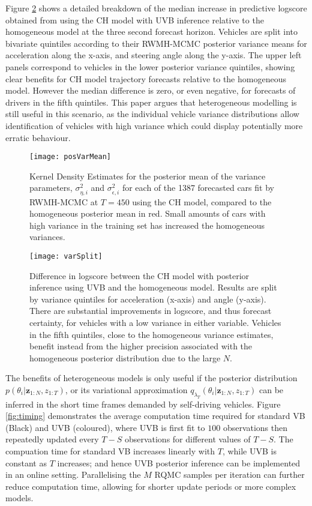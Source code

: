 \documentclass[12pt,a4paper]{article}\usepackage[]{graphicx}\usepackage[]{color}
\begin{document}
Figure \ref{fig:varSplit} shows a detailed breakdown of the median increase in predictive logscore obtained from using the CH model with UVB inference relative to the homogeneous model at the three second forecast horizon. Vehicles are split into bivariate quintiles according to their RWMH-MCMC posterior variance means for acceleration along the x-axis, and steering angle along the y-axis. The upper left panels correspond to vehicles in the lower posterior variance quintiles, showing clear benefits for CH model trajectory forecasts relative to the homogeneous model. However the median difference is zero, or even negative, for forecasts of drivers in the fifth quintiles. This paper argues that heterogeneous modelling is still useful in this scenario, as the individual vehicle variance distributions allow identification of vehicles with high variance which could display potentially more erratic behaviour.
\\


\begin{figure}[ht]
\centering
\texttt{[image: posVarMean]}
\caption{Kernel Density Estimates for the posterior mean of the variance parameters, $\sigma^2_{\eta, i}$ and $\sigma^2_{\epsilon, i}$ for each of the 1387 forecasted cars fit by RWMH-MCMC at $T = 450$ using the CH model, compared to the homogeneous posterior mean in red. Small amounts of cars with high variance in the training set has increased the homogeneous variances.}
\label{fig:posVarMean}
\end{figure}

\begin{figure}[ht]
\centering
\texttt{[image: varSplit]}
\caption{Difference in logscore between the CH model with posterior inference using UVB and the homogeneous model. Results are split by variance quintiles for acceleration (x-axis) and angle (y-axis). There are substantial improvements in logscore, and thus forecast certainty, for vehicles with a low variance in either variable. Vehicles in the fifth quintiles, close to the homogeneous variance estimates, benefit instead from the higher precision associated with the homogeneous posterior distribution due to the large $N$.}
\label{fig:varSplit}
\end{figure}

The benefits of heterogeneous models is only useful if the posterior distribution $p(\theta_{i} | \textbf{z}_{1:N}, z_{1:T})$, or its variational approximation $q_{\lambda_T}(\theta_{i} | \textbf{z}_{1:N}, z_{1:T})$ can be inferred in the short time frames demanded by self-driving vehicles. Figure \ref{fig:timing} demonstrates the average computation time required for standard VB (Black) and UVB (coloured), where UVB is first fit to $100$ observations then repeatedly updated every $T-S$ observations for different values of $T-S$. The compuation time for standard VB increases linearly with $T$, while UVB is constant as $T$ increases; and hence UVB posterior inference can be implemented in an online setting. Parallelising the $M$ RQMC samples per iteration can further reduce computation time, allowing for shorter update periods or more complex models. 
\\ 
\end{document}
